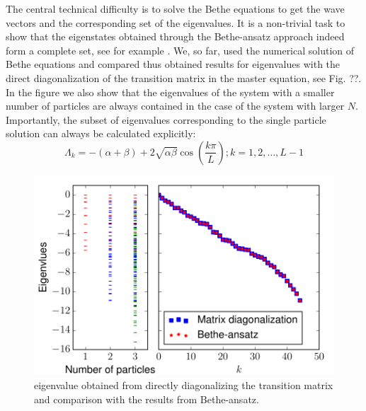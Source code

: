 \documentclass[aps,showpacs,twocolumn,floatfix,prx,superscriptaddress]{revtex4-1}
\begin{document}
The central technical difficulty is to solve the Bethe equations to get the wave vectors and the corresponding set of the eigenvalues. It is a non-trivial task to show that the eigenstates obtained through the Bethe-ansatz approach indeed form a complete set, see for example \cite{}. We, so far, used the numerical solution of Bethe equations and compared thus obtained results for eigenvalues with the direct diagonalization of the transition matrix in the master equation, see Fig. ??. In the figure we also show that the eigenvalues of the system with a smaller number of particles are always contained in the case of the system with larger $N$. Importantly, the subset of eigenvalues corresponding to the single particle solution can always be calculated explicitly: 
    \begin{equation}
        \label{eq:partEigenvaluesN}
        \Lambda_k   = -(\alpha+\beta) + 2\sqrt{\alpha\beta}\cos(\frac{k\pi}{L}); 
        k=1,2,\dots, L-1  
    \end{equation}
\begin{figure}[htpb]
    \centering
    \includegraphics[width=1.0\linewidth]{spectrum}
    \caption{eigenvalue obtained from directly diagonalizing the transition matrix and comparison with the results from Bethe-ansatz.}
    \label{fig:spectrum}
\end{figure}
\end{document}
